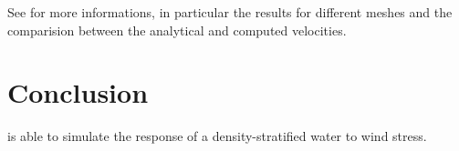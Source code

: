 See \cite{Abbas2015} for more informations, in particular the results for
different meshes and the comparision between the analytical and computed
velocities.

\section{Conclusion}
%
 is able to simulate the response of a density-stratified water to
wind stress.
